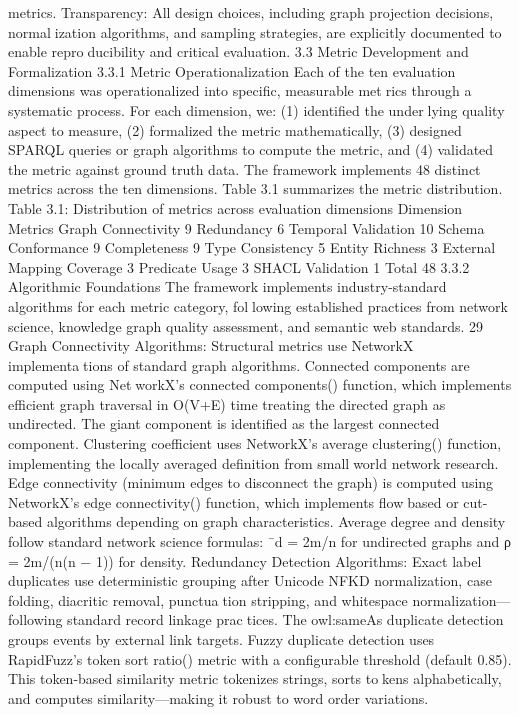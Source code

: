 metrics.
Transparency: All design choices, including graph projection decisions, normalization algorithms, and sampling strategies, are explicitly documented to enable reproducibility and critical evaluation.
3.3 Metric Development and Formalization
3.3.1 Metric Operationalization
Each of the ten evaluation dimensions was operationalized into specific, measurable metrics through a systematic process. For each dimension, we: (1) identified the underlying quality aspect to measure, (2) formalized the metric mathematically, (3) designed
SPARQL queries or graph algorithms to compute the metric, and (4) validated the metric
against ground truth data.
The framework implements 48 distinct metrics across the ten dimensions. Table 3.1
summarizes the metric distribution.
Table 3.1: Distribution of metrics across evaluation dimensions
Dimension Metrics
Graph Connectivity 9
Redundancy 6
Temporal Validation 10
Schema Conformance 9
Completeness 9
Type Consistency 5
Entity Richness 3
External Mapping Coverage 3
Predicate Usage 3
SHACL Validation 1
Total 48
3.3.2 Algorithmic Foundations
The framework implements industry-standard algorithms for each metric category, following established practices from network science, knowledge graph quality assessment,
and semantic web standards.
29
Graph Connectivity Algorithms: Structural metrics use NetworkX implementations of standard graph algorithms. Connected components are computed using NetworkX’s connected components() function, which implements efficient graph traversal
in O(V+E) time treating the directed graph as undirected. The giant component is
identified as the largest connected component. Clustering coefficient uses NetworkX’s
average clustering() function, implementing the locally averaged definition from smallworld network research. Edge connectivity (minimum edges to disconnect the graph)
is computed using NetworkX’s edge connectivity() function, which implements flowbased or cut-based algorithms depending on graph characteristics. Average degree and
density follow standard network science formulas: ¯d = 2m/n for undirected graphs and
ρ = 2m/(n(n − 1)) for density.
Redundancy Detection Algorithms: Exact label duplicates use deterministic
grouping after Unicode NFKD normalization, case folding, diacritic removal, punctuation stripping, and whitespace normalization—following standard record linkage practices. The owl:sameAs duplicate detection groups events by external link targets. Fuzzy
duplicate detection uses RapidFuzz’s token sort ratio() metric with a configurable
threshold (default 0.85). This token-based similarity metric tokenizes strings, sorts tokens alphabetically, and computes similarity—making it robust to word order variations.
